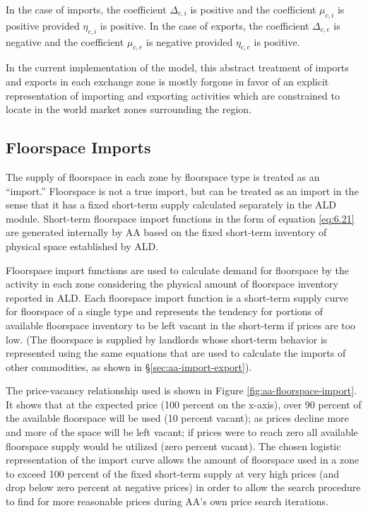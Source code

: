 In the case of imports, the coefficient $\Delta_{c,i}$ is positive and the coefficient $\mu_{c,i}$ is positive provided $\eta_{c,i}$ is positive. In the case of exports, the coefficient $\Delta_{c,e}$ is negative and the coefficient $\mu_{c,e}$ is negative provided $\eta_{c,e}$ is positive.

In the current implementation of the model, this abstract treatment of imports and exports in each exchange zone is mostly forgone in favor of an explicit representation of importing and exporting activities which are constrained to locate in the world market zones surrounding the region.

\subsection{Floorspace Imports}\label{sec:aa-floorspace-imports}
The supply of floorspace in each zone by floorspace type is treated as an ``import.''  Floorspace is not a true import, but can be treated as an import in the sense that it has a fixed short-term supply calculated separately in the ALD module. Short-term floorspace import functions in the form of equation \ref{eq:6.21} are generated internally by AA based on the fixed short-term inventory of physical space established by ALD.

Floorspace import functions are used to calculate demand for floorspace by the activity in each zone considering the physical amount of floorspace inventory reported in ALD. Each floorspace import function is a short-term supply curve for floorspace of a single type and represents the tendency for portions of available floorspace inventory to be left vacant in the short-term if prices are too low. (The floorspace is supplied by landlords whose short-term behavior is represented using the same equations that are used to calculate the imports of other commodities, as shown in \S\ref{sec:aa-import-export}). 
 
The price-vacancy relationship used is shown in Figure \ref{fig:aa-floorspace-import}. It shows that at the expected price (100 percent on the x-axis), over 90 percent of the available floorspace will be used (10 percent vacant); as prices decline more and more of the space will be left vacant; if prices were to reach zero all available floorspace supply would be utilized (zero percent vacant). The chosen logistic representation of the import curve allows the amount of floorspace used in a zone to exceed 100 percent of the fixed short-term supply at very high prices (and drop below zero percent at negative prices) in order to allow the search procedure to find for more reasonable prices during AA's own price search iterations.

